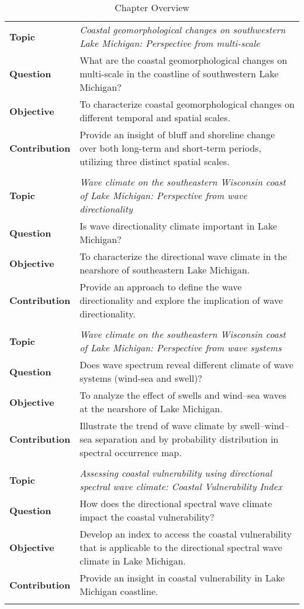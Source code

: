 \renewcommand{\arraystretch}{1}

\begin{longtable}{|>{\raggedright\arraybackslash}p{2.4cm}|p{14cm}|}
\caption{Chapter Overview} \\
\hline
\multicolumn{2}{|c|}{\textbf{Chapter 2}} \\
\hline
\textbf{Topic} & \textit{Coastal geomorphological changes on southwestern Lake Michigan: Perspective from multi-scale} \\
\textbf{Question} & What are the coastal geomorphological changes on multi-scale in the coastline of southwestern Lake Michigan? \\
\textbf{Objective} & To characterize coastal geomorphological changes on different temporal and spatial scales. \\
\textbf{Contribution} & Provide an insight of bluff and shoreline change over both long-term and short-term periods, utilizing three distinct spatial scales. \\
\hline
\multicolumn{2}{|c|}{\textbf{Chapter 3}} \\
\hline
\textbf{Topic} & \textit{Wave climate on the southeastern Wisconsin coast of Lake Michigan: Perspective from wave directionality} \\
\textbf{Question} & Is wave directionality climate important in Lake Michigan? \\
\textbf{Objective} & To characterize the directional wave climate in the nearshore of southeastern Lake Michigan. \\
\textbf{Contribution} & Provide an approach to define the wave directionality and explore the implication of wave directionality. \\
\hline
\multicolumn{2}{|c|}{\textbf{Chapter 4}} \\
\hline
\textbf{Topic} & \textit{Wave climate on the southeastern Wisconsin coast of Lake Michigan: Perspective from wave systems} \\
\textbf{Question} & Does wave spectrum reveal different climate of wave systems (wind-sea and swell)? \\
\textbf{Objective} & To analyze the effect of swells and wind–sea waves at the nearshore of Lake Michigan. \\
\textbf{Contribution} & Illustrate the trend of wave climate by swell–wind–sea separation and by probability distribution in spectral occurrence map. \\
\hline
\multicolumn{2}{|c|}{\textbf{Chapter 5}} \\
\hline
\textbf{Topic} & \textit{Assessing coastal vulnerability using directional spectral wave climate: Coastal Vulnerability Index} \\
\textbf{Question} & How does the directional spectral wave climate impact the coastal vulnerability? \\
\textbf{Objective} & Develop an index to access the coastal vulnerability that is applicable to the directional spectral wave climate in Lake Michigan. \\
\textbf{Contribution} & Provide an insight in coastal vulnerability in Lake Michigan coastline. \\
\hline
\label{overview}
\end{longtable}

